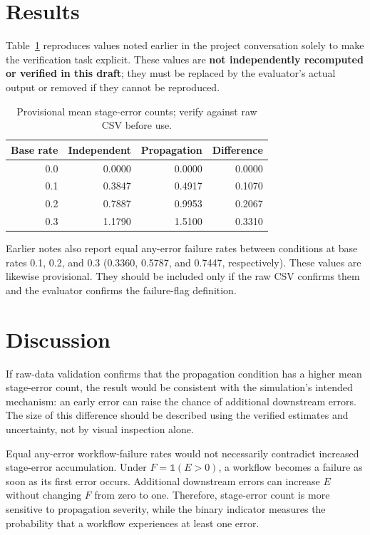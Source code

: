 \documentclass[conference]{IEEEtran}
\begin{document}
\section{Results}
Table~\ref{tab:provisional} reproduces values noted earlier in the project conversation solely to make the verification task explicit. These values are \textbf{not independently recomputed or verified in this draft}; they must be replaced by the evaluator's actual output or removed if they cannot be reproduced.

\begin{table}[ht]
\centering
\caption{Provisional mean stage-error counts; verify against raw CSV before use.}
\label{tab:provisional}
\begin{tabular}{rrrr}
\toprule
Base rate & Independent & Propagation & Difference \\
\midrule
0.0 & 0.0000 & 0.0000 & 0.0000 \\
0.1 & 0.3847 & 0.4917 & 0.1070 \\
0.2 & 0.7887 & 0.9953 & 0.2067 \\
0.3 & 1.1790 & 1.5100 & 0.3310 \\
\bottomrule
\end{tabular}
\end{table}

Earlier notes also report equal any-error failure rates between conditions at base rates 0.1, 0.2, and 0.3 (0.3360, 0.5787, and 0.7447, respectively). These values are likewise provisional. They should be included only if the raw CSV confirms them and the evaluator confirms the failure-flag definition.

\section{Discussion}
If raw-data validation confirms that the propagation condition has a higher mean stage-error count, the result would be consistent with the simulation's intended mechanism: an early error can raise the chance of additional downstream errors. The size of this difference should be described using the verified estimates and uncertainty, not by visual inspection alone.

Equal any-error workflow-failure rates would not necessarily contradict increased stage-error accumulation. Under $F=\mathbb{1}(E>0)$, a workflow becomes a failure as soon as its first error occurs. Additional downstream errors can increase $E$ without changing $F$ from zero to one. Therefore, stage-error count is more sensitive to propagation severity, while the binary indicator measures the probability that a workflow experiences at least one error.
\end{document}
